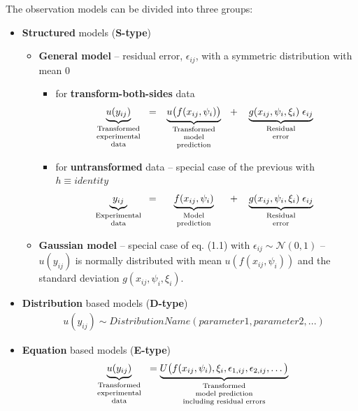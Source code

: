 The observation models can be divided into three groups:
\begin{itemize}
\item 
\textbf{Structured} models (\textbf{S-type})
\begin{itemize}
\item 
\textbf{General model} -- residual error, $\epsilon_{ij}$, with a symmetric distribution with mean 0
\begin{itemize}
 \item
for \textbf{transform-both-sides} data
\begin{eqnarray}
 \underbrace{ u(y_{ij})}_{\text{\parbox{2cm}{\centering Transformed \\[-4pt] experimental \\[-4pt]  data}}} =
 \underbrace{ u\big(f(x_{ij}, \psi_{i})\big)}_{\text{\parbox{2.5cm}{\centering Transformed \\[-4pt]  model \\[-4pt]  prediction}}} +
 \underbrace{ g(x_{ij}, \psi_{i}, \xi_i) \; \epsilon_{ij}}_{\text{\parbox{3cm}{\centering Residual \\[-4pt] error}}}
 \end{eqnarray}
\item
for \textbf{untransformed} data  -- special case of the previous with $h \equiv identity$ 
\begin{eqnarray}
 \underbrace{ y_{ij}}_{\text{\parbox{2cm}{\centering Experimental \\[-4pt]  data}}} =
 \underbrace{ f(x_{ij}, \psi_{i})}_{\text{\parbox{2.5cm}{\centering Model \\[-4pt]  prediction}}} +
 \underbrace{ g(x_{ij}, \psi_{i}, \xi_i) \; \epsilon_{ij}}_{\text{\parbox{3cm}{\centering Residual \\[-4pt] error}}}
 \nonumber
 \end{eqnarray}
\end{itemize}
\item
\textbf{Gaussian model} --  special case of eq. (1.1) with $\epsilon_{ij} \sim \mathcal{N}(0,1)$ --
$u(y_{ij})$ is normally distributed with mean $u(f(x_{ij}, \psi_{i}))$ and the 
standard deviation $g(x_{ij}, \psi_{i}, \xi_i)$. 

\end{itemize}
\item 
\textbf{Distribution} based models (\textbf{D-type})
\begin{align}
	& u(y_{ij})  \sim DistributionName(parameter1, parameter2, ...)
\end{align}
\item
\textbf{Equation} based models  (\textbf{E-type})
\begin{eqnarray}
 \underbrace{ u(y_{ij})}_{\text{\parbox{2cm}{\centering Transformed \\[-4pt] experimental \\[-4pt]  data}}} =
 \underbrace{ U\big(f(x_{ij}, \psi_{i}),\xi_i, \epsilon_{1,ij}, \epsilon_{2,ij}, \dots\big)}_{\text{\parbox{3.5cm}{\centering Transformed \\[-4pt]  model prediction \\[-4pt]  including residual errors}}}
 \end{eqnarray}
\end{itemize}
